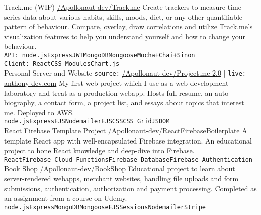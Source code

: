 \documentclass[9pt]{developercv} %
\begin{document}

\begin{entrylist}
  \entryproject
    {Track.me (WIP)}
    {\href{https://github.com/Apollonaut-dev/Track.me}{/Apollonaut-dev/Track.me}}
    {Create trackers to measure time-series data about various habits, skills, moods, diet, or any other quantifiable pattern of behaviour. Compare, overlay, draw correlations and utilize Track.me's visualization features to help you understand yourself and how to change your behaviour.\smallskip \\\texttt{API: }\texttt{node.js}\slashsep\texttt{Express}\slashsep\texttt{JWT}\slashsep\texttt{MongoDB}\slashsep\texttt{Mongoose}\slashsep\texttt{Mocha+Chai+Sinon}\\\texttt{Client: }\texttt{React}\slashsep\texttt{CSS Modules}\slashsep\texttt{Chart.js}}
  \\
  \entryproject
    {Personal Server and Website}
    {\texttt{source:} \href{https://github.com/Apollonaut-dev/Project.me-2.0}{/Apollonaut-dev/Project.me-2.0} | \texttt{live:} \href{http://www.anthony-dev.com}{anthony-dev.com}}
    {My first web project which I use as a web development laboratory and treat as a production webapp. Hosts full resume, an auto-biography, a contact form, a project list, and essays about topics that interest me. Deployed to AWS.\smallskip \\\texttt{node.js}\slashsep\texttt{Express}\slashsep\texttt{EJS}\slashsep\texttt{Nodemailer}\slashsep\texttt{EJS}\slashsep\texttt{CSS}\slashsep\texttt{CSS Grid}\slashsep\texttt{JSDOM}}
  \\
  \entryproject
    {React Firebase Template Project}
    {\href{https://github.com/Apollonaut-dev/ReactFirebaseBoilerplate}{/Apollonaut-dev/ReactFirebaseBoilerplate}}
    {A template React app with well-encapsulated Firebase integration. An educational project to hone React knowledge and deep-dive into Firebase.\\\texttt{React}\slashsep\texttt{Firebase Cloud Functions}\slashsep\texttt{Firebase Database}\slashsep\texttt{Firebase Authentication}}
  \\
  \entryproject
    {Book Shop}
    {\href{https://github.com/Apollonaut-dev/BookShop}{/Apollonaut-dev/BookShop}}
    {Educational project to learn about server-rendered webapps, merchant websites, handling file uploads and form submissions, authentication, authorization and payment processing. Completed as an assignment from a course on Udemy. \smallskip \\\texttt{node.js}\slashsep\texttt{Express}\slashsep\texttt{MongoDB}\slashsep\texttt{Mongoose}\slashsep\texttt{EJS}\slashsep\texttt{Sessions}\slashsep\texttt{Nodemailer}\slashsep\texttt{Stripe}}

\end{entrylist}
\end{document}
